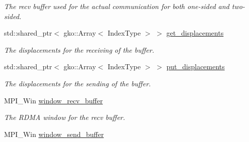 \begin{DoxyCompactItemize}
\begin{DoxyCompactList}\small\item\em The recv buffer used for the actual communication for both one-\/sided and two-\/sided. \end{DoxyCompactList}\item 
\mbox{\label{structSchwarzWrappers_1_1Communicate_1_1comm__struct_a5fee9d0f152a6949ca8eba2369930609}} 
std\+::shared\+\_\+ptr$<$ gko\+::\+Array$<$ Index\+Type $>$ $>$ \hyperlink{structSchwarzWrappers_1_1Communicate_1_1comm__struct_a5fee9d0f152a6949ca8eba2369930609}{get\+\_\+displacements}
\begin{DoxyCompactList}\small\item\em The displacements for the receiving of the buffer. \end{DoxyCompactList}\item 
\mbox{\label{structSchwarzWrappers_1_1Communicate_1_1comm__struct_aa8b49aaca78939447545e9a995de9804}} 
std\+::shared\+\_\+ptr$<$ gko\+::\+Array$<$ Index\+Type $>$ $>$ \hyperlink{structSchwarzWrappers_1_1Communicate_1_1comm__struct_aa8b49aaca78939447545e9a995de9804}{put\+\_\+displacements}
\begin{DoxyCompactList}\small\item\em The displacements for the sending of the buffer. \end{DoxyCompactList}\item 
\mbox{\label{structSchwarzWrappers_1_1Communicate_1_1comm__struct_a4774d872086c96473b817f4b2693ebf2}} 
M\+P\+I\+\_\+\+Win \hyperlink{structSchwarzWrappers_1_1Communicate_1_1comm__struct_a4774d872086c96473b817f4b2693ebf2}{window\+\_\+recv\+\_\+buffer}
\begin{DoxyCompactList}\small\item\em The R\+D\+MA window for the recv buffer. \end{DoxyCompactList}\item 
\mbox{\label{structSchwarzWrappers_1_1Communicate_1_1comm__struct_a455569bca3b2d037240f5c27716aec4f}} 
M\+P\+I\+\_\+\+Win \hyperlink{structSchwarzWrappers_1_1Communicate_1_1comm__struct_a455569bca3b2d037240f5c27716aec4f}{window\+\_\+send\+\_\+buffer}

\end{DoxyCompactItemize}
